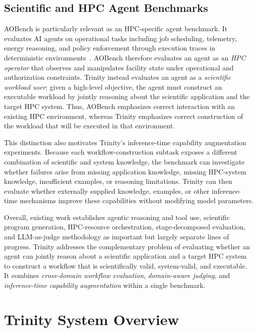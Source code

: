 \documentclass[conference]{IEEEtran}
\begin{document}
\subsection{Scientific and HPC Agent Benchmarks}

AOBench is particularly relevant as an HPC-specific agent benchmark. It evaluates AI agents on operational tasks including job scheduling, telemetry, energy reasoning, and policy enforcement through execution traces in deterministic environments~\cite{aobench}. AOBench therefore evaluates an agent as an \textit{HPC operator} that observes and manipulates facility state under operational and authorization constraints. Trinity instead evaluates an agent as a \textit{scientific workload user}: given a high-level objective, the agent must construct an executable workload by jointly reasoning about the scientific application and the target HPC system. Thus, AOBench emphasizes correct interaction with an existing HPC environment, whereas Trinity emphasizes correct construction of the workload that will be executed in that environment.

This distinction also motivates Trinity's inference-time capability augmentation experiments. Because each workflow-construction subtask exposes a different combination of scientific and system knowledge, the benchmark can investigate whether failures arise from missing application knowledge, missing HPC-system knowledge, insufficient examples, or reasoning limitations. Trinity can then evaluate whether externally supplied knowledge, examples, or other inference-time mechanisms improve these capabilities without modifying model parameters.

Overall, existing work establishes agentic reasoning and tool use, scientific program generation, HPC-resource orchestration, stage-decomposed evaluation, and LLM-as-judge methodology as important but largely separate lines of progress. Trinity addresses the complementary problem of evaluating whether an agent can jointly reason about a scientific application and a target HPC system to construct a workflow that is scientifically valid, system-valid, and executable. It combines \textit{cross-domain workflow evaluation}, \textit{domain-aware judging}, and \textit{inference-time capability augmentation} within a single benchmark.


\section{Trinity System Overview}
\end{document}
